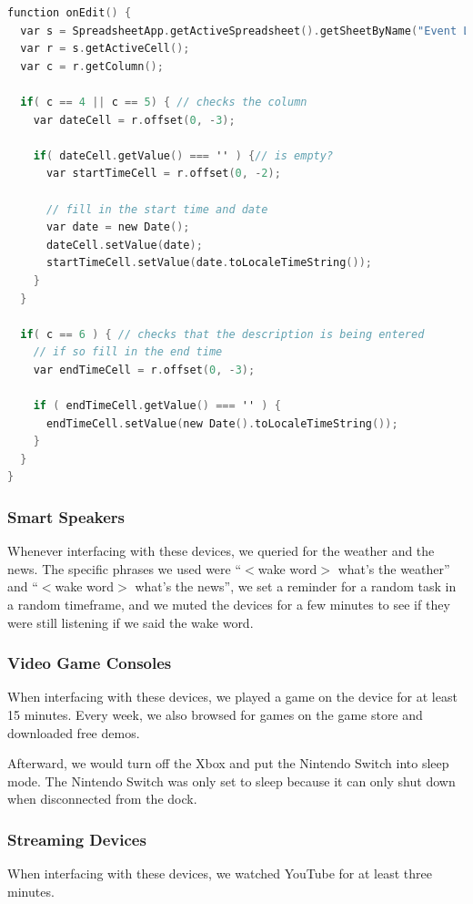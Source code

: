 \noindent
\begin{minipage}{\textwidth}
\begin{lstlisting}[basicstyle=\linespread{0.95}\ttfamily, language=C,label={lst:sheetScript},caption={Open and Read from a Socket}]
function onEdit() {
  var s = SpreadsheetApp.getActiveSpreadsheet().getSheetByName("Event Log");
  var r = s.getActiveCell();
  var c = r.getColumn();

  if( c == 4 || c == 5) { // checks the column
    var dateCell = r.offset(0, -3);

    if( dateCell.getValue() === '' ) {// is empty?
      var startTimeCell = r.offset(0, -2);

      // fill in the start time and date
      var date = new Date();
      dateCell.setValue(date);
      startTimeCell.setValue(date.toLocaleTimeString());
    }
  }

  if( c == 6 ) { // checks that the description is being entered
    // if so fill in the end time
    var endTimeCell = r.offset(0, -3);

    if ( endTimeCell.getValue() === '' ) {
      endTimeCell.setValue(new Date().toLocaleTimeString());
    }
  }
}
\end{lstlisting}
\end{minipage}

\subsubsection{Smart Speakers}
Whenever interfacing with these devices, we queried for the weather and the news. The specific phrases we used were ``$<$wake word$>$ what's the weather'' and ``$<$wake word$>$ what's the news'', we  set a reminder for a random task in a random timeframe, and we muted the devices for a few minutes to see if they were still listening if we said the wake word.

\subsubsection{Video Game Consoles}
When interfacing with these devices, we played a game on the device for at least 15 minutes. Every week, we also browsed for games on the game store and downloaded free demos.

Afterward, we would turn off the Xbox and put the Nintendo Switch into sleep mode. The Nintendo Switch was only set to sleep because it can only shut down when disconnected from the dock.

\subsubsection{Streaming Devices}
When interfacing with these devices, we watched YouTube for at least three minutes.

